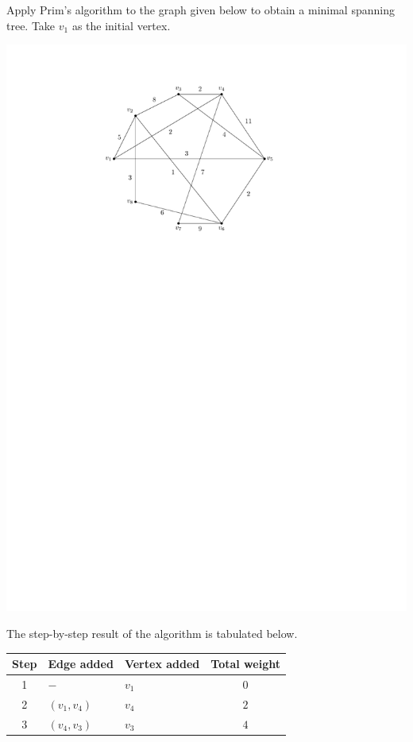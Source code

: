 \begin{Example}
Apply Prim's algorithm to the graph given below to obtain a minimal spanning tree. Take $v_1$ as the initial vertex.
\begin{center}
\includegraphics{Images/Prim.pdf}
\end{center}
\vspace{1em}
The step-by-step result of the algorithm is tabulated below.
\begin{center}
\def\arraystretch{1.3}
\begin{tabular}{c|>{\centering\arraybackslash}p{}|>{\centering\arraybackslash}p{}|c}
Step & Edge added & Vertex added & Total weight \\
\hline
1 & $-$ & $v_1$ & $0$ \\
2 & $(v_1, v_4)$ & $v_4$ & $2$ \\
3 & $(v_4, v_3)$ & $v_3$ & $4$ \\

\end{tabular}
\end{center}
\end{Example}
